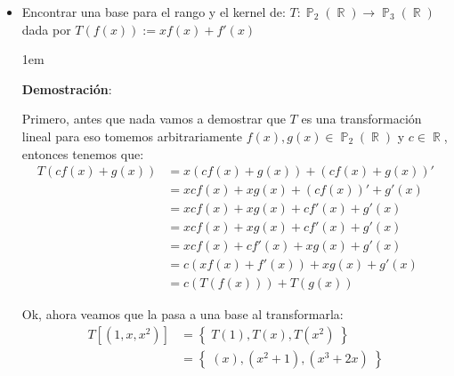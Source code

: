 \documentclass[12pt, fleqn]{report}                             %
\newenvironment{SmallIndentation}[1][0.75em]                    %
        {\begin{adjustwidth}{#1}{}\begin{footnotesize}}             %
        {\end{footnotesize}\end{adjustwidth}}                       %
\theoremstyle{break}                                            %
\DeclareMathOperator \Reals        {\mathbb{R}}                 %
\DeclareMathOperator \Polynomials  {\mathbb{P}}                 %
\newcommand{\Set}[1]            {\left\{ \; #1 \; \right\}}     %
\newcommand{\Wrap}[1]           {\left( #1 \right)}             %
\newcommand{\Brackets}[1]       {\left[ #1 \right]}             %
\begin{document}
                \begin{itemize}

                    \item
                        Encontrar una base para el rango y el kernel de:
                        $T: \Polynomials_2(\Reals) \to \Polynomials_3(\Reals)$
                        dada por $T(f(x)) := xf(x) + f'(x)$

                        \begin{SmallIndentation}[1em]
                            \textbf{Demostración}:
                            
                            Primero, antes que nada vamos a demostrar que $T$ es una transformación lineal
                            para eso tomemos arbitrariamente $f(x), g(x) \in \Polynomials_2(\Reals)$
                            y $c \in \Reals$, entonces tenemos que:
                            \begin{align*}
                                T(cf(x) + g(x))
                                    &= x(cf(x) + g(x)) + (cf(x) + g(x))'         \\
                                    &= xcf(x) + xg(x) + (cf(x))' + g'(x)         \\
                                    &= xcf(x) + xg(x) + cf'(x) + g'(x)           \\
                                    &= xcf(x) + xg(x) + cf'(x) + g'(x)           \\
                                    &= xcf(x) + cf'(x) + xg(x) + g'(x)           \\
                                    &= c(xf(x) + f'(x)) + xg(x) + g'(x)          \\
                                    &= c(T(f(x))) + T(g(x))
                            \end{align*}

                            Ok, ahora veamos que la pasa a una base al transformarla:
                            \begin{align*}
                                T\Brackets{\Wrap{1, x, x^2}}
                                    &= \Set{T(1), T(x), T(x^2)}             \\ 
                                    &= \Set{(x), (x^2 + 1), (x^3 + 2x)}     \\ 
                            \end{align*}


\end{SmallIndentation}
\end{itemize}
\end{document}
